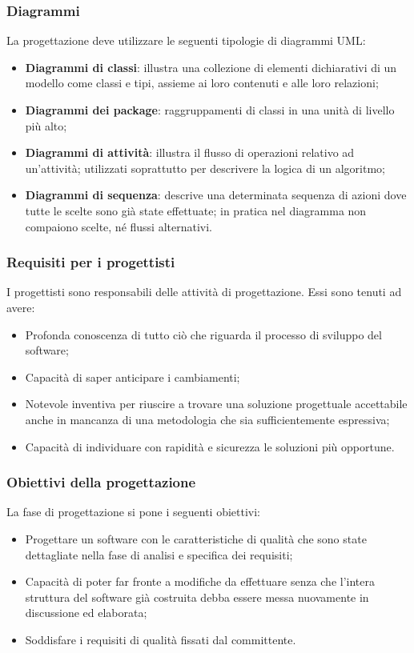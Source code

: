 \subsubsection{Diagrammi}
La progettazione deve utilizzare le seguenti tipologie di diagrammi UML:
\begin{itemize} 
\item
\textbf{Diagrammi di classi}: illustra una collezione di elementi dichiarativi di un modello come classi e tipi, assieme ai loro contenuti e alle loro relazioni;  
\item
\textbf{Diagrammi dei package}: raggruppamenti di classi in una unità di livello più alto;
\item
\textbf{Diagrammi di attività}: illustra il flusso di operazioni relativo ad un'attività; utilizzati soprattutto per descrivere la logica di un algoritmo;  
\item
\textbf{Diagrammi di sequenza}: descrive una determinata sequenza di azioni dove tutte le scelte sono già state effettuate; in pratica nel diagramma non compaiono scelte, né flussi alternativi.
\end{itemize}


\subsubsection{Requisiti per i progettisti}

I progettisti sono responsabili delle attività di progettazione. Essi sono tenuti ad avere:
\begin{itemize} 
\item
Profonda conoscenza di tutto ciò che riguarda il processo di sviluppo del software;
\item
Capacità di saper anticipare i cambiamenti;
\item
Notevole inventiva per riuscire a trovare una soluzione progettuale accettabile anche in mancanza di una metodologia che sia sufficientemente espressiva;
\item
Capacità di individuare con rapidità e sicurezza le soluzioni più opportune.
\end{itemize}

\subsubsection{Obiettivi della progettazione}
La fase di progettazione si pone i seguenti obiettivi:
\begin{itemize} 
\item
Progettare un software con le caratteristiche di qualità che sono state dettagliate nella fase di analisi e specifica dei requisiti;
\item
Capacità di poter far fronte a modifiche da effettuare senza che l'intera struttura del software già costruita debba essere messa nuovamente in discussione ed elaborata;
\item
Soddisfare i requisiti di qualità fissati dal committente.
\end{itemize}


